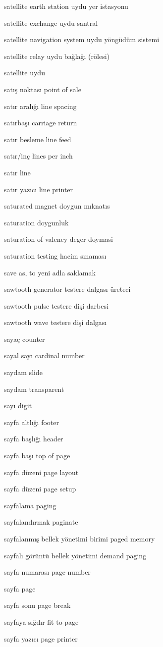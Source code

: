 \documentclass[12pt,fleqn]{article}\usepackage{../../common}
\begin{document}
satellite earth station uydu yer istasyonu

satellite exchange uydu santral

satellite navigation system uydu yöngüdüm sistemi

satellite relay uydu bağlağı (rölesi)

satellite uydu

satış noktası point of sale

satır aralığı line spacing

satırbaşı carriage return

satır besleme line feed

satır/inç lines per inch

satır line

satır yazıcı line printer

saturated magnet doygun mıknatıs

saturation doygunluk

saturation of valency deger doymasi

saturation testing hacim sınaması

save as, to yeni adla saklamak

sawtooth generator testere dalgası üreteci

sawtooth pulse testere dişi darbesi

sawtooth wave testere dişi dalgası

sayaç counter

sayal sayı cardinal number

saydam slide

saydam transparent

sayı digit

sayfa altlığı footer

sayfa başlığı header

sayfa başı top of page

sayfa düzeni page layout

sayfa düzeni page setup

sayfalama paging

sayfalandırmak paginate

sayfalanmış bellek yönetimi birimi paged memory

sayfalı görüntü bellek yönetimi demand paging

sayfa numarası page number

sayfa page

sayfa sonu page break

sayfaya sığdır fit to page

sayfa yazıcı page printer
\end{document}
